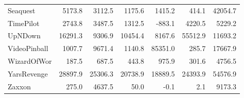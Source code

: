 \begin{table}[t]
{\begin{tabular}{l@{}rrrrrr}
Seaquest       &      5173.8 &    3112.5 &     1175.6 &          1415.2 &              414.1 &  42054.7 \\
TimePilot      &      2743.8 &    3487.5 &     1312.5 &          -883.1 &             4220.5 &   5229.2 \\
UpNDown        &     16291.3 &    9306.9 &    10454.4 &          8167.6 &            55512.9 &  11693.2 \\
VideoPinball   &      1007.7 &    9671.4 &     1140.8 &         85351.0 &              285.7 &  17667.9 \\
WizardOfWor    &       187.5 &     687.5 &      443.8 &           975.9 &              301.6 &   4756.5 \\
YarsRevenge    &     28897.9 &   25306.3 &    20738.9 &         18889.5 &            24393.9 &  54576.9 \\
Zaxxon         &       275.0 &    4637.5 &       50.0 &            -0.1 &                2.1 &   9173.3 \\
\bottomrule
\end{tabular}}
\end{table}